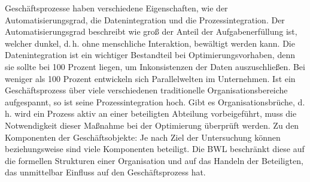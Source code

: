 Geschäftsprozesse haben verschiedene Eigenschaften, wie der Automatisierungsgrad, die Datenintegration und die Prozessintegration. Der Automatisierungsgrad beschreibt wie groß der Anteil der Aufgabenerfüllung ist, welcher dunkel, d.\,h. ohne menschliche Interaktion, bewältigt werden kann. Die Datenintegration ist ein wichtiger Bestandteil bei Optimierungsvorhaben, denn sie sollte bei 100 Prozent liegen, um Inkonsistenzen der Daten auszuschließen. Bei weniger als 100 Prozent entwickeln sich Parallelwelten im Unternehmen. Ist ein Geschäftsprozess über viele verschiedenen traditionelle Organisationsbereiche aufgespannt, so ist seine Prozessintegration hoch. Gibt es Organisationsbrüche, d.\,h. wird ein Prozess aktiv an einer beteiligten Abteilung vorbeigeführt, muss die Notwendigkeit dieser Maßnahme bei der Optimierung überprüft werden. Zu den Komponenten der Geschäftsobjekte: Je nach Ziel der Untersuchung können beziehungsweise sind viele Komponenten beteiligt. Die \ac{BWL} beschränkt diese auf die formellen Strukturen einer Organisation und auf das Handeln der Beteiligten, das unmittelbar Einfluss auf den Geschäftsprozess hat.\autocite[vgl.][S.\,15]{staud_geschaftsprozessanalyse_2006} \par

